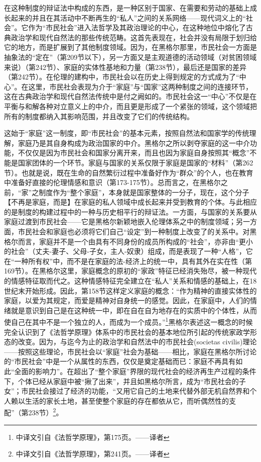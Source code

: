 在这种制度的辩证法中构成的东西，是一种区别于国家、在需要和劳动的基础上成长起来的并且在其活动中不断再生的“私人”之间的关系网络——现代词义上的“社会”。它作为“市民社会”进入法哲学及其政治理论的中心，在这种地位中熔化了古典政治学和现代自然法的那些传统范畴。这首先表现在，社会并没有局限于划归给它的地方，而是扩展到了其他制度领域。因为，在黑格尔那里，市民社会一方面是抽象法的“定在”（第209节以下），另一方面又是主观道德的活动领域（对贫困领域来说）（第242节）、家庭的实体性基地和力量（第238节），最后还是国家的差异（第242节）。在伦理的建构中，市民社会以在历史上得到规定的方式成为了“中心”。在这里，市民社会表现为介于“家庭”与“国家”这两种制度之间的连接环节，这在古典政治学和现代自然法传统中是付之阙如的。市民社会这一“中心”不仅是在平衡与和解各种对立意义上的中介，而且更是形成了一个紧张的领域，这个领域把所有的制度都纳入其影响范围，并且改变了它们的传统结构。

这始于“家庭”这一制度，即“市民社会”的基本元素，按照自然法和国家学的传统理解，家庭乃是其自身构成为政治国家的中介。黑格尔之所以剥夺家庭的这一中介功能，不仅仅是因为市民社会和国家分离开来，而且也因为家庭自身按照其“概念”不能是国家团体的一个环节。家庭与国家的关系仅限于家庭是国家的“材料”（第262节）。也就是说，既在生命的自然繁衍过程中准备好作为“群众”的个人，也在教育中准备好直接的伦理情感和意识（第173-175节）。总而言之，在黑格尔之前，“家”之制度作为“整个家庭”，本身就是国家整体的一分子，现在，这个分子【不再是家庭，而是】在家庭的私人领域中成长起来并受到教育的个体。与此相应的是制度的构建过程中的一种与历史相平行的辩证法。一方面，与国家的关系要从家庭过渡到市民社会——它是黑格尔新颖地嵌入伦理体系之中的制度领域；另一方面，市民社会和家庭也必须将它们自己“设定”到一种制度上改变了的关系中。对黑格尔而言，家庭并不是一个由具有不同身份的成员所构成的“社会”，亦非由“更小的社会”（丈夫-妻子、父母-子女，主人-奴隶）组成，而是表现了一种“人格”，它在“一种所有权”中，而不是在家庭的法-经济上的统一中，具有其外在实在性（第169节）。在黑格尔这里，家庭概念的原初的“家政”特征已经消失殆尽，被一种现代的情感特征取而代之。这种情感特征完全建立在“私人”关系和情感的基础上，在18世纪末开始形成。因此，第158节这样定义家庭的概念：“作为精神的直接实体性的家庭，以爱为其规定，而爱是精神对自身统一的感觉。因此，在家庭中，人们的情绪就是意识到自己是在这种统一中，即在自在自为地存在的实质中的个体性，从而使自己在其中不是一个独立的人，而成为一个成员。”\footnote{中译文引自《法哲学原理》，第175页。——译者}黑格尔表述这一概念的时候完全认识到了《法哲学原理》体系中的市民社会的基本地位所引起的传统家政学形态的改变。因为，与迄今为止的政治学和自然法中的市民社会(societas civilis)理论——按照这些理论，市民社会以“家庭”社会为基础——相比，家庭在黑格尔所讨论的“市民社会”中是一个从属性的东西，仅仅是奠定基础而已：家庭不再具有如此“全面的影响力”。在超出了“整个家庭”界限的现代社会的经济再生产过程的条件下，个体已经从家庭中被“揪了出来”，并且如黑格尔所言，成为“市民社会的子女”；市民社会接过了经济的功能，“又用它自己的土地来代替外部无机自然界和个人赖以生活的家长土地，甚至使整个家庭的存在都依从它，而听偶然性的支配”（第238节）\footnote{中译文引自《法哲学原理》，第241页。——译者}。

